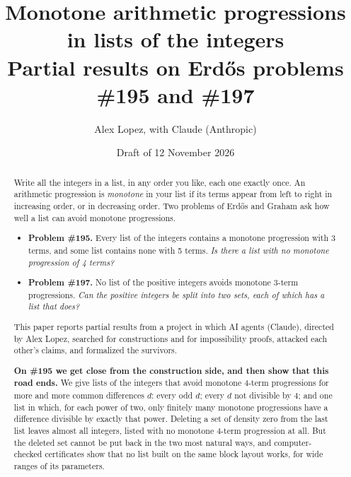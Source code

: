 \documentclass[11pt,letterpaper]{article}
\title{Monotone arithmetic progressions in lists of the integers\\[6pt]
\large Partial results on Erd\H{o}s problems \#195 and \#197}
\author{Alex Lopez, with Claude (Anthropic)}
\date{Draft of 12 November 2026}
\begin{document}
\maketitle

\begin{center}
\end{center}

\begin{abstract}
\noindent Write all the integers in a list, in any order you like, each one exactly once. An arithmetic
progression is \emph{monotone} in your list if its terms appear from left to right in increasing order, or
in decreasing order. Two problems of Erd\H{o}s and Graham ask how well a list can avoid monotone progressions.
\begin{itemize}
\item \textbf{Problem \#195.} Every list of the integers contains a monotone progression with 3 terms, and
some list contains none with 5 terms. \emph{Is there a list with no monotone progression of 4 terms?}
\item \textbf{Problem \#197.} No list of the positive integers avoids monotone 3-term progressions.
\emph{Can the positive integers be split into two sets, each of which has a list that does?}
\end{itemize}
This paper reports partial results from a project in which AI agents (Claude), directed by Alex Lopez,
searched for constructions and for impossibility proofs, attacked each other's claims, and formalized the
survivors.

\smallskip
\textbf{On \#195 we get close from the construction side, and then show that this road ends.} We give lists
of the integers that avoid monotone 4-term progressions for more and more common differences $d$: every odd
$d$; every $d$ not divisible by 4; and one list in which, for each power of two, only finitely many monotone
progressions have a difference divisible by exactly that power. Deleting a set of density zero from the last
list leaves almost all integers, listed with no monotone 4-term progression at all. But the deleted set
cannot be put back in the two most natural ways, and computer-checked certificates show that no list built
on the same block layout works, for wide ranges of its parameters.


\end{abstract}
\end{document}
